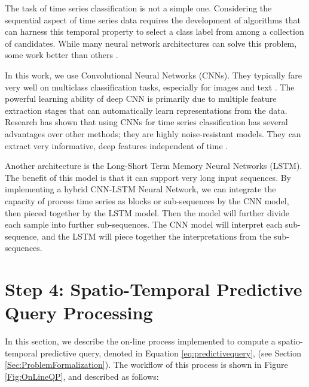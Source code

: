 The task of time series classification is not a simple one. Considering the sequential aspect of time series data requires the development of algorithms that can harness this temporal property to select a class label from among a collection of candidates. While many neural network architectures can solve this problem, some work better than others \cite{Bagnall2017a}.

In this work, we use Convolutional Neural Networks (CNNs). They typically fare very well on multiclass classification tasks, especially for images and text \cite{Goodfellow2016}. The powerful learning ability of deep CNN is primarily due to multiple feature extraction stages that can automatically learn representations from the data. Research has shown that using CNNs for time series classification has several advantages over other methods; they are highly noise-resistant models. They can extract very informative, deep features independent of time \cite{Wang2016, Bagnall2017a, Zhao2017}.

Another architecture is the Long-Short Term Memory Neural Networks (LSTM). The benefit of this model is that it can support very long input sequences. By implementing a hybrid CNN-LSTM Neural Network, we can integrate the capacity of process time series as blocks or sub-sequences by the CNN model, then pieced together by the LSTM model. Then the model will further divide each sample into further sub-sequences. The CNN model will interpret each sub-sequence, and the LSTM will piece together the interpretations from the sub-sequences. 


\section{Step 4: Spatio-Temporal Predictive Query Processing}
\label{Sec:SpatioTemporalQueryProcessing}	

In this section, we describe the on-line process implemented to compute a spatio-temporal predictive query, denoted in Equation \ref{eq:predictivequery}, (see Section \ref{Sec:ProblemFormalization}). The workflow of this process is shown in Figure \ref{Fig:OnLineQP}, and described as follows: 

